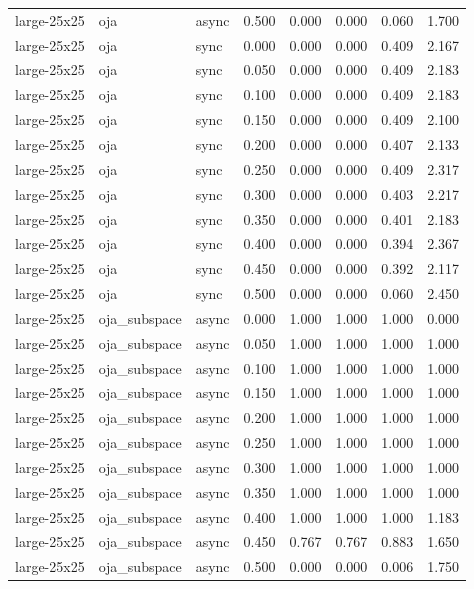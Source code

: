 \begin{tabular}{lllrrrrr}
large-25x25 & oja & async & 0.500 & 0.000 & 0.000 & 0.060 & 1.700 \\
large-25x25 & oja & sync & 0.000 & 0.000 & 0.000 & 0.409 & 2.167 \\
large-25x25 & oja & sync & 0.050 & 0.000 & 0.000 & 0.409 & 2.183 \\
large-25x25 & oja & sync & 0.100 & 0.000 & 0.000 & 0.409 & 2.183 \\
large-25x25 & oja & sync & 0.150 & 0.000 & 0.000 & 0.409 & 2.100 \\
large-25x25 & oja & sync & 0.200 & 0.000 & 0.000 & 0.407 & 2.133 \\
large-25x25 & oja & sync & 0.250 & 0.000 & 0.000 & 0.409 & 2.317 \\
large-25x25 & oja & sync & 0.300 & 0.000 & 0.000 & 0.403 & 2.217 \\
large-25x25 & oja & sync & 0.350 & 0.000 & 0.000 & 0.401 & 2.183 \\
large-25x25 & oja & sync & 0.400 & 0.000 & 0.000 & 0.394 & 2.367 \\
large-25x25 & oja & sync & 0.450 & 0.000 & 0.000 & 0.392 & 2.117 \\
large-25x25 & oja & sync & 0.500 & 0.000 & 0.000 & 0.060 & 2.450 \\
large-25x25 & oja\_subspace & async & 0.000 & 1.000 & 1.000 & 1.000 & 0.000 \\
large-25x25 & oja\_subspace & async & 0.050 & 1.000 & 1.000 & 1.000 & 1.000 \\
large-25x25 & oja\_subspace & async & 0.100 & 1.000 & 1.000 & 1.000 & 1.000 \\
large-25x25 & oja\_subspace & async & 0.150 & 1.000 & 1.000 & 1.000 & 1.000 \\
large-25x25 & oja\_subspace & async & 0.200 & 1.000 & 1.000 & 1.000 & 1.000 \\
large-25x25 & oja\_subspace & async & 0.250 & 1.000 & 1.000 & 1.000 & 1.000 \\
large-25x25 & oja\_subspace & async & 0.300 & 1.000 & 1.000 & 1.000 & 1.000 \\
large-25x25 & oja\_subspace & async & 0.350 & 1.000 & 1.000 & 1.000 & 1.000 \\
large-25x25 & oja\_subspace & async & 0.400 & 1.000 & 1.000 & 1.000 & 1.183 \\
large-25x25 & oja\_subspace & async & 0.450 & 0.767 & 0.767 & 0.883 & 1.650 \\
large-25x25 & oja\_subspace & async & 0.500 & 0.000 & 0.000 & 0.006 & 1.750 \\

\end{tabular}
